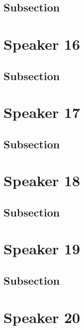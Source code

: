 \documentclass[
]{book}
\begin{document}
\hypertarget{subsection}{%
\section{Subsection}\label{subsection}}

\hypertarget{speaker-16}{%
\chapter*{Speaker 16}\label{speaker-16}}

\hypertarget{subsection}{%
\section{Subsection}\label{subsection}}

\hypertarget{speaker-17}{%
\chapter*{Speaker 17}\label{speaker-17}}

\hypertarget{subsection}{%
\section{Subsection}\label{subsection}}

\hypertarget{speaker-18}{%
\chapter*{Speaker 18}\label{speaker-18}}

\hypertarget{subsection}{%
\section{Subsection}\label{subsection}}

\hypertarget{speaker-19}{%
\chapter*{Speaker 19}\label{speaker-19}}

\hypertarget{subsection}{%
\section{Subsection}\label{subsection}}

\hypertarget{speaker-20}{%
\chapter*{Speaker 20}\label{speaker-20}}
\end{document}
